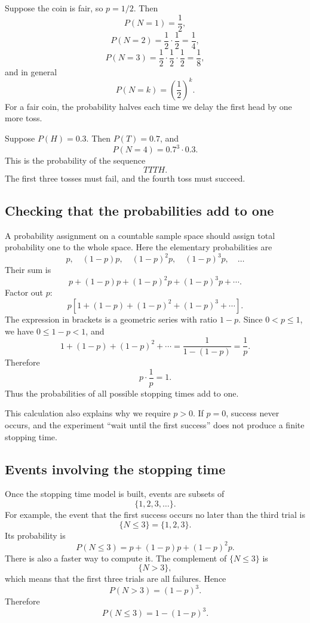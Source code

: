 \begin{examplebox}
Suppose the coin is fair, so \(p=1/2\). Then
\[
P(N=1)=\frac12,
\]
\[
P(N=2)=\frac12\cdot\frac12=\frac14,
\]
\[
P(N=3)=\frac12\cdot\frac12\cdot\frac12=\frac18,
\]
and in general
\[
P(N=k)=\left(\frac12\right)^k.
\]
For a fair coin, the probability halves each time we delay the first head by one
more toss.
\end{examplebox}

\begin{examplebox}
Suppose \(P(H)=0.3\). Then \(P(T)=0.7\), and
\[
P(N=4)=0.7^3\cdot0.3.
\]
This is the probability of the sequence
\[
TTTH.
\]
The first three tosses must fail, and the fourth toss must succeed.
\end{examplebox}

\subsection*{Checking that the probabilities add to one}

A probability assignment on a countable sample space should assign total
probability one to the whole space. Here the elementary probabilities are
\[
p,\quad (1-p)p,\quad (1-p)^2p,\quad (1-p)^3p,\quad \ldots
\]
Their sum is
\[
p+(1-p)p+(1-p)^2p+(1-p)^3p+\cdots.
\]
Factor out \(p\):
\[
p\left[1+(1-p)+(1-p)^2+(1-p)^3+\cdots\right].
\]
The expression in brackets is a geometric series with ratio \(1-p\). Since
\(0<p\leq 1\), we have \(0\leq 1-p<1\), and
\[
1+(1-p)+(1-p)^2+\cdots=\frac1{1-(1-p)}=\frac1p.
\]
Therefore
\[
p\cdot\frac1p=1.
\]
Thus the probabilities of all possible stopping times add to one.

\begin{remarkbox}
This calculation also explains why we require \(p>0\). If \(p=0\), success never
occurs, and the experiment ``wait until the first success'' does not produce a
finite stopping time.
\end{remarkbox}

\subsection*{Events involving the stopping time}

Once the stopping time model is built, events are subsets of
\[
\{1,2,3,\ldots\}.
\]
For example, the event that the first success occurs no later than the third
trial is
\[
\{N\leq 3\}=\{1,2,3\}.
\]
Its probability is
\[
P(N\leq 3)=p+(1-p)p+(1-p)^2p.
\]
There is also a faster way to compute it. The complement of \(\{N\leq 3\}\) is
\[
\{N>3\},
\]
which means that the first three trials are all failures. Hence
\[
P(N>3)=(1-p)^3.
\]
Therefore
\[
P(N\leq 3)=1-(1-p)^3.
\]

